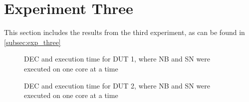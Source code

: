 \section{Experiment Three}\label{app:exp_three}

This section includes the results from the third experiment, as can be found in \cref{subsec:exp_three}


\begin{figure}[H]
    \centering
    \begin{subfigure}[b]{0.4\textwidth}
        \centering
        
    \end{subfigure}
    \hfill
    \begin{subfigure}[b]{0.4\textwidth}
        \centering
        
    \end{subfigure}
    \caption{DEC and execution time for DUT 1, where NB and SN were executed on one core at a time}
\end{figure}

\begin{figure}[H]
    \centering
    \begin{subfigure}[b]{0.4\textwidth}
        \centering
        
    \end{subfigure}
    \hfill
    \begin{subfigure}[b]{0.4\textwidth}
        \centering
        
    \end{subfigure}
    \caption{DEC and execution time for DUT 2, where NB and SN were executed on one core at a time}
\end{figure}


% 


% 

% 

